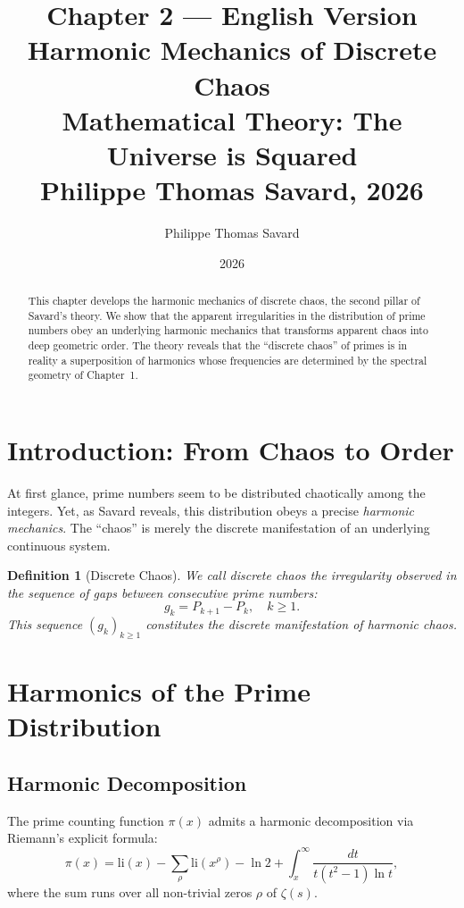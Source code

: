 \documentclass[12pt,a4paper]{article}
\title{%
  \textbf{Chapter 2 — English Version}\\[0.5em]
  \Large Harmonic Mechanics of Discrete Chaos\\[0.5em]
  \large Mathematical Theory: The Universe is Squared\\[0.5em]
  \normalsize Philippe Thomas Savard, 2026
}
\author{Philippe Thomas Savard}
\date{2026}
\newtheorem{definition}{Definition}
\begin{document}
\maketitle
\tableofcontents
\newpage

\begin{abstract}
This chapter develops the harmonic mechanics of discrete chaos, the second pillar
of Savard's theory. We show that the apparent irregularities in the distribution
of prime numbers obey an underlying harmonic mechanics that transforms apparent
chaos into deep geometric order. The theory reveals that the ``discrete chaos''
of primes is in reality a superposition of harmonics whose frequencies are determined
by the spectral geometry of Chapter~1.
\end{abstract}

\section{Introduction: From Chaos to Order}

At first glance, prime numbers seem to be distributed chaotically among the integers.
Yet, as Savard reveals, this distribution obeys a precise \emph{harmonic mechanics}.
The ``chaos'' is merely the discrete manifestation of an underlying continuous system.

\begin{definition}[Discrete Chaos]
We call \emph{discrete chaos} the irregularity observed in the sequence of gaps
between consecutive prime numbers:
\[
  g_k = P_{k+1} - P_k, \quad k \geq 1.
\]
This sequence $(g_k)_{k \geq 1}$ constitutes the discrete manifestation of harmonic chaos.
\end{definition}

\section{Harmonics of the Prime Distribution}

\subsection{Harmonic Decomposition}

The prime counting function $\pi(x)$ admits a harmonic decomposition via Riemann's
explicit formula:
\[
  \pi(x) = \mathrm{li}(x) - \sum_{\rho} \mathrm{li}(x^\rho) - \ln 2 +
  \int_x^{\infty} \frac{dt}{t(t^2-1)\ln t},
\]
where the sum runs over all non-trivial zeros $\rho$ of $\zeta(s)$.
\end{document}
